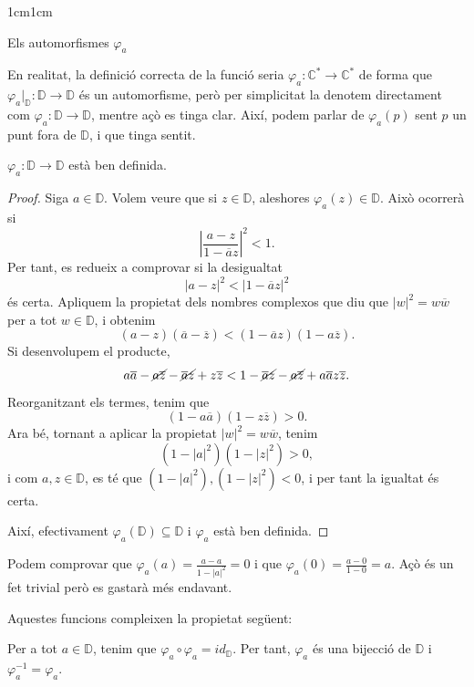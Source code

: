 \begin{adjustwidth}{1cm}{1cm}
\begin{subsection}{Els automorfismes \texorpdfstring{$\varphi_a$}{C}}
\begin{nota}
    En realitat, la definició correcta de la funció seria $\varphi_a:\mathbb{C}^*\to \mathbb{C}^*$ de forma que $\varphi_a|_{\mathbb{D}}:\mathbb{D}\to \mathbb{D}$ és un automorfisme, però per simplicitat la denotem directament com $\varphi_a:\mathbb{D}\to \mathbb{D}$, mentre açò es tinga clar. Així, podem parlar de $\varphi_a(p)$ sent $p$ un punt fora de $\mathbb{D}$, i que tinga sentit.
    \label{nota_varphi_a} 
\end{nota}

\begin{proposicio}
    $\varphi_a:\mathbb{D}\to \mathbb{D}$ està ben definida.
\end{proposicio}

\begin{proof}
    Siga $a\in \mathbb{D}$. Volem veure que si $z\in \mathbb{D}$, aleshores $\varphi_a(z)\in \mathbb{D}$. Això ocorrerà si 
    \[
        \left|\frac{a-z}{1-\overline{a}z}\right|^2<1.
    \]
    Per tant, es redueix a comprovar si la desigualtat
    \[
        |a-z|^2<|1-\overline{a}z|^2
    \]
    és certa. Apliquem la propietat dels nombres complexos que diu que $|w|^2=w\overline{w}$ per a tot $w\in \mathbb{D}$, i obtenim
    \[
        (a-z)(\overline{a}-\overline{z})<(1-\overline{a}z)(1-a\overline{z}).
    \]
    Si desenvolupem el producte,
    \[
        a\overline{a}-\cancel{a\overline{z}}-\cancel{\overline{a}z}+z\overline{z}<1-\cancel{\overline{a}z}-\cancel{a\overline{z}}+a\overline{a}z\overline{z}.
    \]
    Reorganitzant els termes, tenim que
    \[
        (1-a\overline{a})(1-z\overline{z})>0.
    \]
    Ara bé, tornant a aplicar la propietat $|w|^2=w\overline{w}$, tenim
    \[
        (1-|a|^2)(1-|z|^2)>0,
    \]
    i com $a,z\in \mathbb{D}$, es té que $(1-|a|^2),(1-|z|^2)<0$, i per tant la igualtat és certa.

    Així, efectivament $\varphi_a(\mathbb{D})\subseteq \mathbb{D}$ i $\varphi_a$ està ben definida.

\end{proof}

\begin{nota}
    Podem comprovar que $\varphi_a(a)=\frac{a-a}{1-|a|^2}=0$ i que $\varphi_a(0)=\frac{a-0}{1-0}=a$. Açò és un fet trivial però es gastarà més endavant.
    \label{varphi_a_en_a}
\end{nota}

Aquestes funcions compleixen la propietat següent:

\begin{proposicio}
    Per a tot $a\in \mathbb{D}$, tenim que $\varphi_a \circ \varphi_a=id_{\mathbb{D}}$. Per tant, $\varphi_a$ és una bijecció de $\mathbb{D}$ i $\varphi_a^{-1}=\varphi_a$.
    \label{varphi_a_comp_varphi_a_es_id}
\end{proposicio}


\end{subsection}
\end{adjustwidth}
